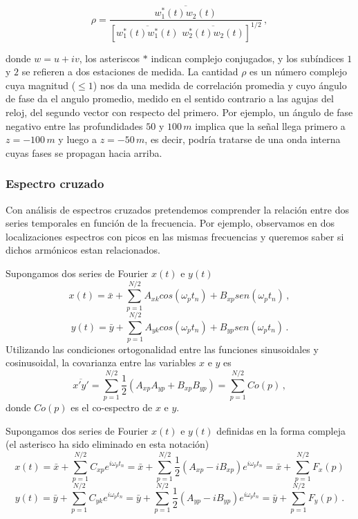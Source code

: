 \documentclass[
]{agujournal2019}
\begin{document}
\[\rho=\frac{\overline{w_1^*(t)w_2(t)}}
{\left[ \overline{w_1^*(t)w_1^*(t)}\,\, \overline{w_2^*(t)w_2(t)} \right]^{1/2}}\,,\]

donde \(w=u+i v\), los asteriscos \(*\) indican complejo conjugados, y
los subíndices \(1\) y \(2\) se refieren a dos estaciones de medida. La
cantidad \(\rho\) es un número complejo cuya magnitud (\(\le1\)) nos da
una medida de correlación promedia y cuyo ángulo de fase da el angulo
promedio, medido en el sentido contrario a las agujas del reloj, del
segundo vector con respecto del primero. Por ejemplo, un ángulo de fase
negativo entre las profundidades \(50\) y \(100\,{ m}\) implica que la
señal llega primero a \(z=-100\,{ m}\) y luego a \(z=-50\,{ m}\), es
decir, podría tratarse de una onda interna cuyas fases se propagan hacia
arriba.

\vspace{0.5cm}

\subsubsection{Espectro cruzado}\label{espectro-cruzado}

Con análisis de espectros cruzados pretendemos comprender la relación
entre dos series temporales en función de la frecuencia. Por ejemplo,
observamos en dos localizaciones espectros con picos en las mismas
frecuencias y queremos saber si dichos armónicos estan relacionados.

Supongamos dos series de Fourier \(x(t)\) e \(y(t)\)
\[x(t)=\bar{x}+\sum\limits^{N/2}_{p=1} A_{xk} cos(\omega_p t_n) + B_{xp}sen(\omega_p t_n)\,,\]
\[y(t)=\bar{y}+\sum\limits^{N/2}_{p=1} A_{yk}cos(\omega_p t_n) + B_{yp}sen(\omega_p t_n)\,.\]
Utilizando las condiciones ortogonalidad entre las funciones
sinusoidales y cosinusoidal, la covarianza entre las variables \(x\) e
\(y\) es
\[\overline{x'y'}=\sum\limits^{N/2}_{p=1} \frac{1}{2}( A_{xp}A_{yp}  + B_{xp}B_{yp})=\sum\limits^{N/2}_{p=1}Co(p)\,,\]
donde \(Co(p)\) es el co-espectro de \(x\) e \(y\).

Supongamos dos series de Fourier \(x(t)\) e \(y(t)\) definidas en la
forma compleja (el asterisco ha sido eliminado en esta notación)
\[x(t)=\bar{x}+\sum\limits^{N/2}_{p=1}
  C_{xp} e^{i\omega_p t_n}=\bar{x}+
  \sum\limits^{N/2}_{p=1}\frac{1}{2}\left(A_{xp} - iB_{xp} \right)e^{i\omega_p t_n}=\bar{x}+
  \sum\limits^{N/2}_{p=1}F_x(p)\] \[y(t)=\bar{y}+\sum\limits^{N/2}_{p=1}
  C_{yk} e^{i\omega_p t_n}=\bar{y}+
  \sum\limits^{N/2}_{p=1}\frac{1}{2}\left(A_{yp} - iB_{yp} \right)e^{i\omega_p t_n}=\bar{y}+
  \sum\limits^{N/2}_{p=1}F_y(p)\,.\]
\end{document}
